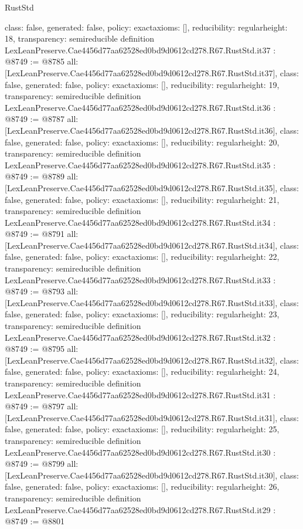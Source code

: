 \begin{lexlean}{RustStd}
\begin{coremodule}
{  class: false,
  generated: false,
  policy: exact{axioms: []},
  reducibility: regular{height: 18},
  transparency: semireducible
}
definition LexLeanPreserve.Cae4456d77aa62528ed0bd9d0612cd278.R67.RustStd.it37 : @8749 := @8785 {
  all: [LexLeanPreserve.Cae4456d77aa62528ed0bd9d0612cd278.R67.RustStd.it37],
  class: false,
  generated: false,
  policy: exact{axioms: []},
  reducibility: regular{height: 19},
  transparency: semireducible
}
definition LexLeanPreserve.Cae4456d77aa62528ed0bd9d0612cd278.R67.RustStd.it36 : @8749 := @8787 {
  all: [LexLeanPreserve.Cae4456d77aa62528ed0bd9d0612cd278.R67.RustStd.it36],
  class: false,
  generated: false,
  policy: exact{axioms: []},
  reducibility: regular{height: 20},
  transparency: semireducible
}
definition LexLeanPreserve.Cae4456d77aa62528ed0bd9d0612cd278.R67.RustStd.it35 : @8749 := @8789 {
  all: [LexLeanPreserve.Cae4456d77aa62528ed0bd9d0612cd278.R67.RustStd.it35],
  class: false,
  generated: false,
  policy: exact{axioms: []},
  reducibility: regular{height: 21},
  transparency: semireducible
}
definition LexLeanPreserve.Cae4456d77aa62528ed0bd9d0612cd278.R67.RustStd.it34 : @8749 := @8791 {
  all: [LexLeanPreserve.Cae4456d77aa62528ed0bd9d0612cd278.R67.RustStd.it34],
  class: false,
  generated: false,
  policy: exact{axioms: []},
  reducibility: regular{height: 22},
  transparency: semireducible
}
definition LexLeanPreserve.Cae4456d77aa62528ed0bd9d0612cd278.R67.RustStd.it33 : @8749 := @8793 {
  all: [LexLeanPreserve.Cae4456d77aa62528ed0bd9d0612cd278.R67.RustStd.it33],
  class: false,
  generated: false,
  policy: exact{axioms: []},
  reducibility: regular{height: 23},
  transparency: semireducible
}
definition LexLeanPreserve.Cae4456d77aa62528ed0bd9d0612cd278.R67.RustStd.it32 : @8749 := @8795 {
  all: [LexLeanPreserve.Cae4456d77aa62528ed0bd9d0612cd278.R67.RustStd.it32],
  class: false,
  generated: false,
  policy: exact{axioms: []},
  reducibility: regular{height: 24},
  transparency: semireducible
}
definition LexLeanPreserve.Cae4456d77aa62528ed0bd9d0612cd278.R67.RustStd.it31 : @8749 := @8797 {
  all: [LexLeanPreserve.Cae4456d77aa62528ed0bd9d0612cd278.R67.RustStd.it31],
  class: false,
  generated: false,
  policy: exact{axioms: []},
  reducibility: regular{height: 25},
  transparency: semireducible
}
definition LexLeanPreserve.Cae4456d77aa62528ed0bd9d0612cd278.R67.RustStd.it30 : @8749 := @8799 {
  all: [LexLeanPreserve.Cae4456d77aa62528ed0bd9d0612cd278.R67.RustStd.it30],
  class: false,
  generated: false,
  policy: exact{axioms: []},
  reducibility: regular{height: 26},
  transparency: semireducible
}
definition LexLeanPreserve.Cae4456d77aa62528ed0bd9d0612cd278.R67.RustStd.it29 : @8749 := @8801 {
}
\end{coremodule}
\end{lexlean}
